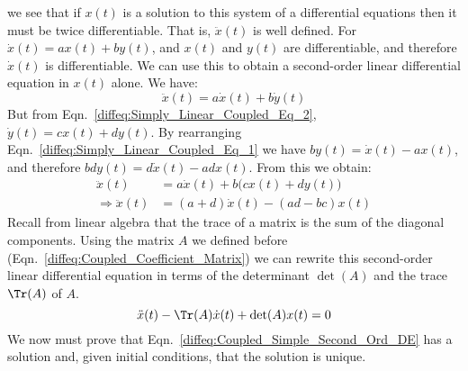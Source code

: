             we see that if $x(t)$ is a solution to this system
            of a differential equations then it must be twice
            differentiable. That is, $\ddot{x}(t)$ is well defined.
            For $\dot{x}(t)=ax(t)+by(t)$, and $x(t)$ and
            $y(t)$ are differentiable, and therefore $\dot{x}(t)$
            is differentiable. We can use this to obtain a
            second-order linear differential equation in $x(t)$
            alone. We have:
            \begin{equation}
                \ddot{x}(t)=a\dot{x}(t)+b\dot{y}(t)
            \end{equation}
            But from Eqn.~\ref{diffeq:Simply_Linear_Coupled_Eq_2},
            $\dot{y}(t)=cx(t)+dy(t)$. By rearranging
            Eqn.~\ref{diffeq:Simply_Linear_Coupled_Eq_1} we have
            $by(t)=\dot{x}(t)-ax(t)$, and therefore
            $bdy(t)=d\dot{x}(t)-adx(t)$. From this we obtain:
            \begin{subequations}
                \begin{align}
                    \ddot{x}(t)
                    &=a\dot{x}(t)+b\big(cx(t)+dy(t)\big)\\
                    \Rightarrow\ddot{x}(t)
                    &=(a+d)\dot{x}(t)-(ad-bc)x(t)
                \end{align}
            \end{subequations}
            Recall from linear algebra that the trace of a
            matrix is the sum of the diagonal components. Using
            the matrix $A$ we defined before
            (Eqn.~\ref{diffeq:Coupled_Coefficient_Matrix})
            we can rewrite this second-order linear differential
            equation in terms of the determinant
            $\det(A)$ and the trace $\Tr(A)$ of $A$.
            \begin{equation}
                \label{diffeq:Coupled_Simple_Second_Ord_DE}
                \ddot{x}(t)-\Tr(A)\dot{x}(t)+\det(A)x(t)=0
            \end{equation}
            We now must prove that
            Eqn.~\ref{diffeq:Coupled_Simple_Second_Ord_DE} has
            a solution and, given initial conditions, that the
            solution is unique.
